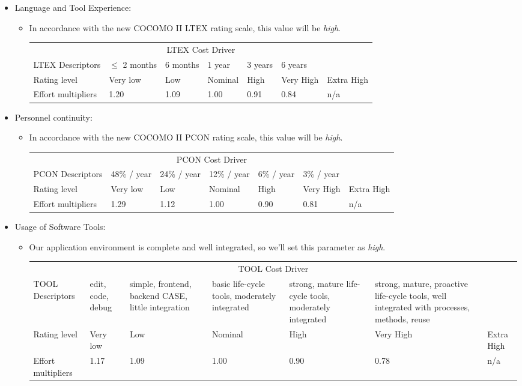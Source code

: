 \documentclass[english]{article}
\newenvironment{costdriverstable}[1]{
	\setlength{\LTleft}{-40pt}
	\begin{longtable}{|p{\dimexpr.16\textwidth}|p{\dimexpr.14\textwidth}|p{\dimexpr.14\textwidth}|p{\dimexpr.14\textwidth}|p{\dimexpr.14\textwidth}|p{\dimexpr.14\textwidth}|p{\dimexpr.14\textwidth}|}
	\hline
	\multicolumn{7}{|c|}{{#1}}\\\hhline{|=======|}
}{
	\hline\end{longtable}
}
\newcommand{\costdescriptors}[7]{
	#1 & #2 & #3 & #4 & #5 & #6 & #7\\
}
\newcommand{\ratinglevel}[6]{
	Rating level & #1 & #2 & #3 & #4 & #5 & #6 \\\hline
}
\newcommand{\effortmultipliers}[6]{
	Effort multipliers & #1 & #2 & #3 & #4 & #5 & #6 \\\hline
}
\begin{document}
\begin{itemize}
	\item Language and Tool Experience: 
	\begin{itemize}
	\item[]  In accordance with the new COCOMO II LTEX rating scale, this value will be \textit{high}.
	\begin{costdriverstable}{LTEX Cost Driver}
		\costdescriptors{LTEX Descriptors}{$\le$ 2 months}{6 months}{1 year}{3 years}{6 years}{}\hline
		\ratinglevel{Very low}{Low}{Nominal}{High}{Very High}{Extra High}
		\effortmultipliers{1.20}{1.09}{1.00}{0.91}{0.84}{n/a}
	\end{costdriverstable}
	\end{itemize}
\end{itemize}

\begin{itemize}
	\item Personnel continuity: 
	\begin{itemize}
	\item[]  In accordance with the new COCOMO II PCON rating scale, this value will be \textit{high}. 
	\begin{costdriverstable}{PCON Cost Driver}
		\costdescriptors{PCON Descriptors}{48\% / year}{24\% / year}{12\% / year}{6\% / year}{3\% / year}{}\hline	
		\ratinglevel{Very low}{Low}{Nominal}{High}{Very High}{Extra High}
		\effortmultipliers{1.29}{1.12}{1.00}{0.90}{0.81}{n/a}
	\end{costdriverstable}
	\end{itemize}
\end{itemize}

\begin{itemize}
	\item Usage of Software Tools: 
	\begin{itemize}
	\item[] Our application environment is complete and well integrated, so we'll set this parameter as \textit{high}. 
	\begin{costdriverstable}{TOOL Cost Driver}
		\costdescriptors{TOOL Descriptors}{edit, code, debug}{simple, frontend, backend CASE, little integration}{basic life-cycle tools, moderately integrated}{strong, mature life-cycle tools, moderately integrated}{strong, mature, proactive life-cycle tools, well integrated with processes, methods, reuse}{}\hline
		\ratinglevel{Very low}{Low}{Nominal}{High}{Very High}{Extra High}
		\effortmultipliers{1.17}{1.09}{1.00}{0.90}{0.78}{n/a}	
	\end{costdriverstable}
	\end{itemize}
\end{itemize}
\end{document}

